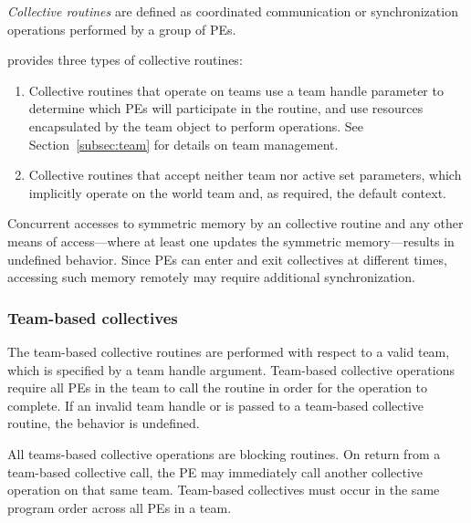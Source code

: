 \emph{Collective routines} are defined as coordinated communication or synchronization
operations performed by a group of \acp{PE}.

\openshmem provides three types of collective routines:

\begin{enumerate}
\item Collective routines that operate on teams use a team handle parameter to determine
  which \acp{PE} will participate in the routine, and use resources encapsulated by the team object
  to perform operations. See Section~\ref{subsec:team} for details on team management.


\item Collective routines that accept neither team nor active set
  parameters, which implicitly operate on the world team and, as
  required, the default context.
\end{enumerate}

Concurrent accesses to symmetric memory by an \openshmem collective
routine and any other means of access---where at least one updates the
symmetric memory---results in undefined behavior.
Since \acp{PE} can enter and exit collectives at different times,
accessing such memory remotely may require additional synchronization.

\subsubsection*{Team-based collectives}

The team-based collective routines are performed with respect to a valid
\openshmem team, which is specified by a team handle argument.
Team-based collective operations require all \acp{PE} in the team to call
the routine in order for the operation to complete. If an invalid team handle
or  is passed to a team-based collective
routine, the behavior is undefined.

All \openshmem teams-based collective operations are blocking routines.  On
return from a team-based collective call, the \ac{PE} may immediately call
another collective operation on that same team.
Team-based collectives must occur in the same
program order across all \acp{PE} in a team.

